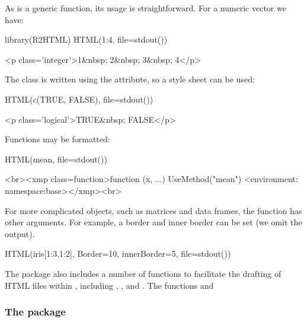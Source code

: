 As  is a generic function, its usage is straightforward. For a
numeric vector we have:
\begin{Schunk}
\begin{Sinput}
 library(R2HTML)
 HTML(1:4, file=stdout())
\end{Sinput}
\begin{Soutput}
<p class='integer'>1&nbsp; 2&nbsp; 3&nbsp; 4</p>
\end{Soutput}
\end{Schunk}
The class is written using the  attribute, so a style
sheet can be used:
\begin{Schunk}
\begin{Sinput}
 HTML(c(TRUE, FALSE), file=stdout())
\end{Sinput}
\begin{Soutput}
<p class='logical'>TRUE&nbsp; FALSE</p>
\end{Soutput}
\end{Schunk}

Functions may be formatted:
\begin{Schunk}
\begin{Sinput}
 HTML(mean, file=stdout())
\end{Sinput}
\begin{Soutput}
<br><xmp class=function>function (x, ...) 
UseMethod("mean")
<environment: namespace:base></xmp><br>
\end{Soutput}
\end{Schunk}

For more complicated objects, such as matrices and data frames, the
 function has other arguments. For example, a border
and inner border can be set (we omit the output).
\begin{Schunk}
\begin{Sinput}
 HTML(iris[1:3,1:2], Border=10, innerBorder=5, file=stdout())
\end{Sinput}
\end{Schunk}

The package also includes a number of functions to facilitate the
drafting of HTML files within \R, including ,
,  and
. The functions  and


\subsubsection{The  package}
\label{sec:pkgbrew-package}

